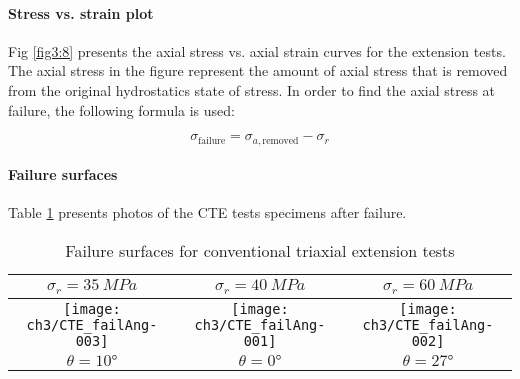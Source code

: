 \paragraph{Stress vs. strain plot}

Fig \ref{fig3:8} presents the axial stress vs. axial strain curves for the extension tests. The axial stress in the figure represent the amount of axial stress that is removed from the original hydrostatics state of stress. In order to find the axial stress at failure, the following formula is used: 

\begin{equation}
    \sigma_\text{failure} = \sigma_{a,\text{removed}} - \sigma_r
\end{equation}

\paragraph{Failure surfaces}

Table \ref{tb3:photoCTE} presents photos of the CTE tests specimens after failure. 


\begin{table}
    \centering
    \captionsetup{justification=centering}
    \caption{Failure surfaces for conventional triaxial extension tests}
    \begin{tabular}{|c|c|c|}
     \hline
     $\sigma_r = \SI{35}{MPa}$ & $\sigma_r = \SI{40}{MPa}$ &  $\sigma_r = \SI{60}{MPa}$ \\
     \hline
     \texttt{[image: ch3/CTE\_failAng-003]} & 
     \texttt{[image: ch3/CTE\_failAng-001]} &
     \texttt{[image: ch3/CTE\_failAng-002]} \\
     \hline
     $\theta = \ang{10}$ & $\theta = \ang{0}$  &  $\theta = \ang{27}$ \\
     \hline
    \end{tabular}
    \label{tb3:photoCTE}
\end{table}

